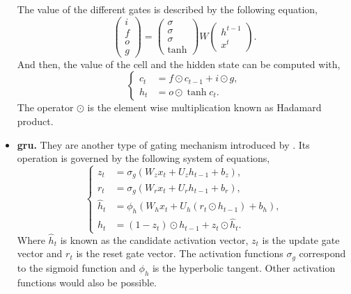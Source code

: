 \begin{itemize}
  The value of the different gates is described by the following equation,
  \begin{equation}
    \begin{pmatrix}
      i \\
      f \\
      o \\
      g
    \end{pmatrix} =
    \begin{pmatrix}
      \sigma \\
      \sigma \\
      \sigma \\
      \tanh
    \end{pmatrix}
    W
    \begin{pmatrix}
      h^{t-1} \\
      x^t
    \end{pmatrix}.
  \end{equation}
  And then, the value of the cell and the hidden state can be computed with,
  \begin{equation}
    \begin{cases}
      c_t &= f \odot c_{t-1} + i \odot g, \\
      h_t &= o \odot \tanh c_{t}.
    \end{cases}
  \end{equation}
  The operator \(\odot\) is the element wise multiplication known as Hadamard
  product.
  \item \textbf{\gls*{gru}.} They are another type of gating mechanism
  introduced by . Its operation is governed by the
  following system of equations,
  \begin{equation}
    \begin{cases}
      z_{t}&=\sigma _{g}(W_{z}x_{t}+U_{z}h_{t-1}+b_{z}), \\
      r_{t}&=\sigma _{g}(W_{r}x_{t}+U_{r}h_{t-1}+b_{r}), \\
      {\hat {h}}_{t}&=\phi _{h}(W_{h}x_{t}+U_{h}(r_{t}\odot h_{t-1})+b_{h}), \\
      h_{t}&=(1-z_{t})\odot h_{t-1}+z_{t}\odot {\hat {h}}_{t}.
    \end{cases}
  \end{equation}
  Where \(\hat{h}_t\) is known as the candidate activation vector, \(z_t\) is
  the update gate vector and \(r_t\) is the reset gate vector. The activation
  functions \(\sigma_g\) correspond to the sigmoid function and \(\phi_{h}\) is
  the hyperbolic tangent. Other activation functions would also be possible.
\end{itemize}


